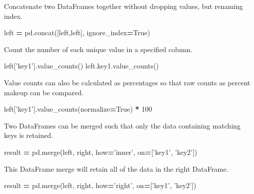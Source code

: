 \documentclass[]{book}
\newenvironment{Shaded}{\begin{snugshade}}{\end{snugshade}}
\newcommand{\DecValTok}[1]{\textcolor[rgb]{0.00,0.00,0.81}{#1}}
\newcommand{\NormalTok}[1]{#1}
\newcommand{\OperatorTok}[1]{\textcolor[rgb]{0.81,0.36,0.00}{\textbf{#1}}}
\newcommand{\StringTok}[1]{\textcolor[rgb]{0.31,0.60,0.02}{#1}}
\newcommand{\VariableTok}[1]{\textcolor[rgb]{0.00,0.00,0.00}{#1}}
\begin{document}
Concatenate two DataFrames together without dropping values, but renaming index.

\begin{Shaded}
\begin{Highlighting}[]
\NormalTok{left }\OperatorTok{=}\NormalTok{ pd.concat([left,left], ignore_index}\OperatorTok{=}\VariableTok{True}\NormalTok{)}
\end{Highlighting}
\end{Shaded}

Count the number of each unique value in a specified column.

\begin{Shaded}
\begin{Highlighting}[]
\NormalTok{left[}\StringTok{'key1'}\NormalTok{].value_counts()}
\NormalTok{left.key1.value_counts()}
\end{Highlighting}
\end{Shaded}

Value counts can also be calculated as percentages so that raw counts as percent makeup can be compared.

\begin{Shaded}
\begin{Highlighting}[]
\NormalTok{left[}\StringTok{'key1'}\NormalTok{].value_counts(normalize}\OperatorTok{=}\VariableTok{True}\NormalTok{) }\OperatorTok{*} \DecValTok{100}
\end{Highlighting}
\end{Shaded}

Two DataFrames can be merged such that only the data containing matching keys is retained.

\begin{Shaded}
\begin{Highlighting}[]
\NormalTok{result }\OperatorTok{=}\NormalTok{ pd.merge(left, right, how}\OperatorTok{=}\StringTok{'inner'}\NormalTok{, on}\OperatorTok{=}\NormalTok{[}\StringTok{'key1'}\NormalTok{, }\StringTok{'key2'}\NormalTok{])}
\end{Highlighting}
\end{Shaded}

This DataFrame merge will retain all of the data in the right DataFrame.

\begin{Shaded}
\begin{Highlighting}[]
\NormalTok{result }\OperatorTok{=}\NormalTok{ pd.merge(left, right, how}\OperatorTok{=}\StringTok{'right'}\NormalTok{, on}\OperatorTok{=}\NormalTok{[}\StringTok{'key1'}\NormalTok{, }\StringTok{'key2'}\NormalTok{])}
\end{Highlighting}
\end{Shaded}
\end{document}
